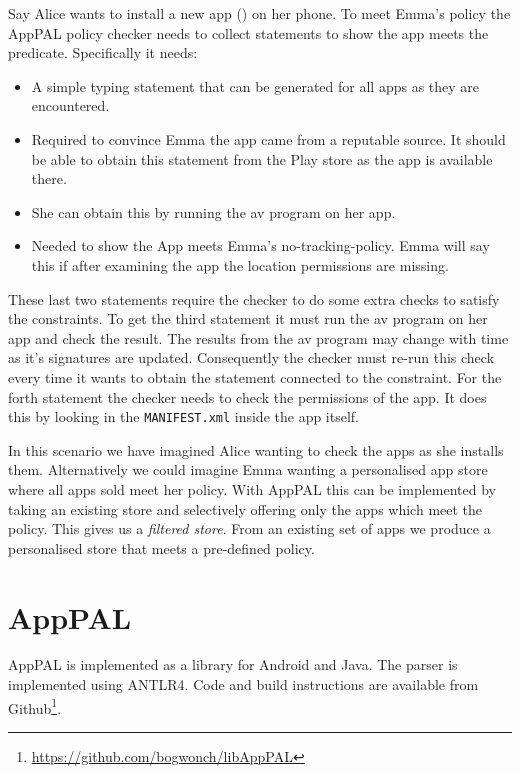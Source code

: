 \documentclass[]{scrartcl}
\begin{document}
Say Alice wants to install a new app () on her phone.
To meet Emma's policy the AppPAL policy checker needs to collect statements to show the app meets the  predicate.
Specifically it needs:
\begin{itemize}
  \item{}
    A simple typing statement that can be generated for all apps as they are encountered.
  \item{}
    Required to convince Emma the app came from a reputable source.
    It should be able to obtain this statement from the Play store as the app is available there.
  \item{}
    She can obtain this by running the \ac{av} program on her app.
  \item{}
    Needed to show the App meets Emma's no-tracking-policy.
    Emma will say this if after examining the app the location permissions are missing.
\end{itemize}
These last two statements require the checker to do some extra checks to satisfy the constraints.
To get the third statement it must run the \ac{av} program on her app and check the result.
The results from the \ac{av} program may change with time as it's signatures are updated.
Consequently the checker must re-run this check every time it wants to obtain the statement connected to the constraint.
For the forth statement the checker needs to check the permissions of the app.
It does this by looking in the \texttt{MANIFEST.xml} inside the app itself.

In this scenario we have imagined Alice wanting to check the apps as she installs them.
Alternatively we could imagine Emma wanting a personalised app store where all apps sold meet her policy.
With AppPAL this can be implemented by taking an existing store and selectively offering only the apps which meet the policy.
This gives us a \emph{filtered store}.
From an existing set of apps we produce a personalised store that meets a pre-defined policy.

\section{AppPAL}
\label{sec:details}

AppPAL is implemented as a library for Android and Java.
The parser is implemented using ANTLR4.
Code and build instructions are available from Github\footnote{\url{https://github.com/bogwonch/libAppPAL}}.
\end{document}
